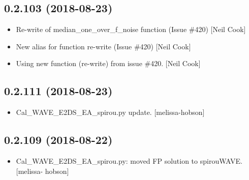 \documentclass[a4paper,10pt,english]{report}
\begin{document}
\subsection{0.2.103 (2018-08-23)}
\label{\detokenize{misc/changelog:id355}}\begin{itemize}
\item {} 
Re-write of median\_one\_over\_f\_noise function (Issue \#420) {[}Neil Cook{]}

\item {} 
New alias for function re-write (Issue \#420) {[}Neil Cook{]}

\item {} 
Using new function (re-write) from issue \#420. {[}Neil Cook{]}

\end{itemize}


\subsection{0.2.111 (2018-08-23)}
\label{\detokenize{misc/changelog:id356}}\begin{itemize}
\item {} 
Cal\_WAVE\_E2DS\_EA\_spirou.py update. {[}melissa-hobson{]}

\end{itemize}


\subsection{0.2.109 (2018-08-22)}
\label{\detokenize{misc/changelog:id357}}\begin{itemize}
\item {} 
Cal\_WAVE\_E2DS\_EA\_spirou.py: moved FP solution to spirouWAVE. {[}melissa-
hobson{]}

\end{itemize}
\end{document}
